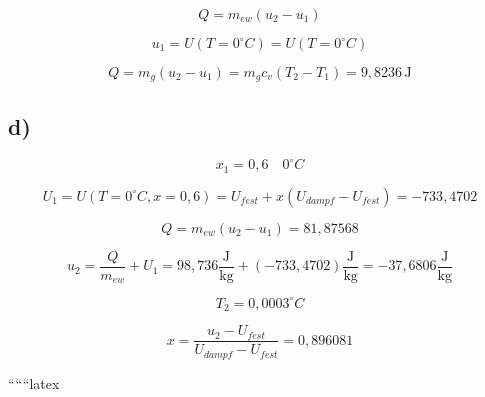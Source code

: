 \[
Q = m_{ew} (u_2 - u_1)
\]

\[
u_1 = U(T=0^\circ C) = U(T=0^\circ C)
\]

\[
Q = m_g (u_2 - u_1) = m_g c_v (T_2 - T_1) = 9,8236 \, \text{J}
\]

\subsection*{d)}

\[
x_1 = 0,6 \quad 0^\circ C
\]

\[
U_1 = U(T=0^\circ C, x=0,6) = U_{fest} + x (U_{dampf} - U_{fest}) = -733,4702
\]

\[
Q = m_{ew} (u_2 - u_1) = 81,87568
\]

\[
u_2 = \frac{Q}{m_{ew}} + U_1 = 98,736 \frac{\text{J}}{\text{kg}} + (-733,4702) \frac{\text{J}}{\text{kg}} = -37,6806 \frac{\text{J}}{\text{kg}}
\]

\[
T_2 = 0,0003^\circ C
\]

\[
x = \frac{u_2 - U_{fest}}{U_{dampf} - U_{fest}} = 0,896081
\]

``````latex


